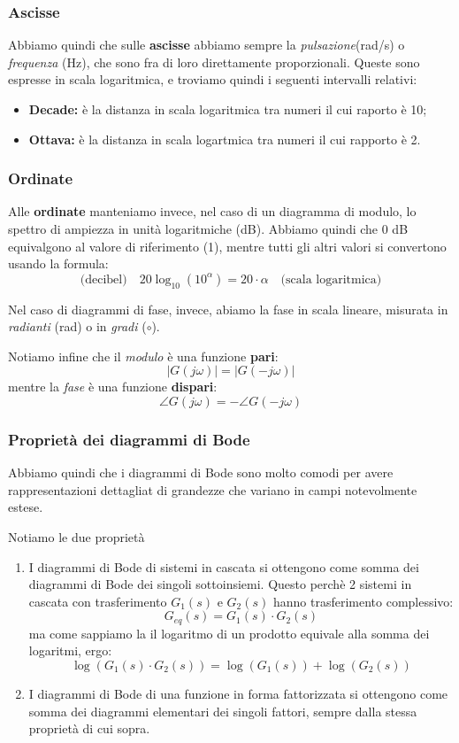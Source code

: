 \documentclass[a4paper,11pt]{article}
\begin{document}
\subsubsection{Ascisse}
Abbiamo quindi che sulle \textbf{ascisse} abbiamo sempre la \textit{pulsazione}(rad/s) o \textit{frequenza} (Hz), che sono fra di loro direttamente proporzionali.
Queste sono espresse in scala logaritmica, e troviamo quindi i seguenti intervalli relativi:
\begin{itemize}
	\item \textbf{Decade:} è la distanza in scala logaritmica tra numeri il cui raporto è 10;
	\item \textbf{Ottava:} è la distanza in scala logartmica tra numeri il cui rapporto è 2.
\end{itemize}

\subsubsection{Ordinate}
Alle \textbf{ordinate} manteniamo invece, nel caso di un diagramma di modulo, lo spettro di ampiezza in unità logaritmiche (dB).
Abbiamo quindi che 0 dB equivalgono al valore di riferimento (1), mentre tutti gli altri valori si convertono usando la formula:
$$
\text{(decibel)} \quad 20 \log_{10}(10^\alpha) = 20 \cdot \alpha \quad \text{(scala logaritmica)}
$$

Nel caso di diagrammi di fase, invece, abiamo la fase in scala lineare, misurata in \textit{radianti} (rad) o in \textit{gradi} ($\circ$).

\par\medskip

Notiamo infine che il \textit{modulo} è una funzione \textbf{pari}:
$$
|G(j \omega)| = |G(-j \omega)|
$$
mentre la \textit{fase} è una funzione \textbf{dispari}:
$$
\angle G(j \omega) = - \angle G(-j \omega)
$$

\subsubsection{Proprietà dei diagrammi di Bode}
Abbiamo quindi che i diagrammi di Bode sono molto comodi per avere rappresentazioni dettagliat di grandezze che variano in campi notevolmente estese.

Notiamo le due proprietà
\begin{enumerate}
	\item 
I diagrammi di Bode di sistemi in cascata si ottengono come somma dei diagrammi di Bode dei singoli sottoinsiemi.
Questo perchè 2 sistemi in cascata con trasferimento $G_1(s)$ e $G_2(s)$ hanno trasferimento complessivo:
$$
G_{eq}(s) = G_1(s) \cdot G_2(s)
$$
ma come sappiamo la il logaritmo di un prodotto equivale alla somma dei logaritmi, ergo:
$$
\log \left( G_1(s) \cdot G_2(s) \right) = \log \left( G_1(s) \right) + \log \left( G_2(s) \right)
$$

	\item
I diagrammi di Bode di una funzione in forma fattorizzata si ottengono come somma dei diagrammi elementari dei singoli fattori, sempre dalla stessa proprietà di cui sopra.
\end{enumerate}
\end{document}
